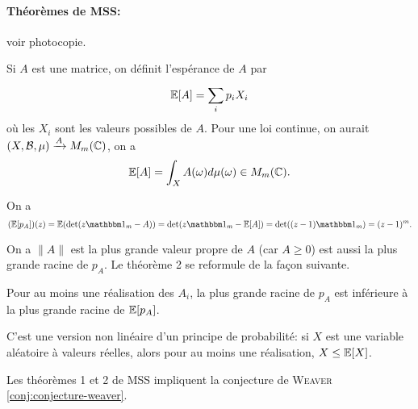 \paragraph{Théorèmes de MSS:} voir photocopie.

Si $A$ est une matrice, on définit l'espérance de $A$ par 
\[ \mathbb{E}[A] = \sum_{i}^{} p_i X_i \]
où les $X_i$ sont les valeurs possibles de $A$. Pour une loi continue, on aurait $(X, \mathcal{B}, \mu)
\xrightarrow{A} M_m(\mathbb{C})$, on a 
\[ \mathbb{E}[A] = \int_X A(\omega) d\mu(\omega) \in M_m(\mathbb{C}). \]

\begin{preuve}
  On a 
  \[ (\E[p_A])(z) = \E(\det(z \un_m - A)) = \det(z \un_m - \E[A]) = \det((z - 1)\un_m) = (z - 1)^m. \]
\end{preuve}

On a $\|A\|$ est la plus grande valeur propre de $A$ (car $A \geq 0$) est aussi la plus grande racine de $p_A$. Le théorème 2 se reformule de la
façon suivante.

\begin{theo}
  Pour au moins une réalisation des $A_i$, la plus grande racine de $p_A$ est inférieure à la plus grande
  racine de $\mathbb{E}[p_A]$.
\end{theo}


C'est une version non linéaire d'un principe de probabilité: si $X$ est une variable aléatoire à valeurs
réelles, alors pour au moins une réalisation, $X \leq \mathbb{E}[X]$.


\begin{prop}
  Les théorèmes 1 et 2 de MSS impliquent la conjecture de \textsc{Weaver} \ref{conj:conjecture-weaver}.
\end{prop}

